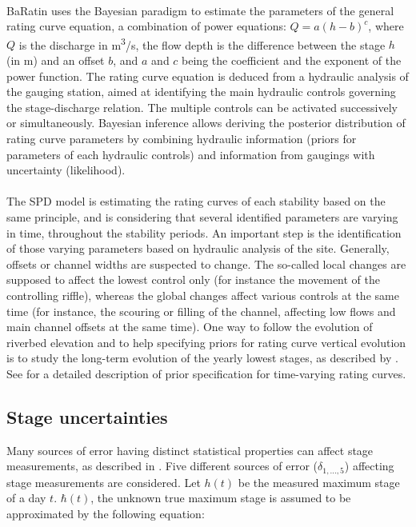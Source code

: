 \documentclass[11pt]{article}
\begin{document}
    \paragraph{} BaRatin uses the Bayesian paradigm to estimate the parameters of the general rating curve equation, a combination of power equations: $Q = a(h-b)^c$, where $Q$ is the discharge in m\textsuperscript{3}/s, the flow depth is the difference between the stage $h$ (in m) and an offset $b$, and $a$ and $c$ being the coefficient and the exponent of the power function. The rating curve equation is deduced from a hydraulic analysis of the gauging station, aimed at identifying the main hydraulic controls governing the stage-discharge relation. The multiple controls can be activated successively or simultaneously. Bayesian inference allows deriving the posterior distribution of rating curve parameters by combining hydraulic information (priors for parameters of each hydraulic controls) and information from gaugings with uncertainty (likelihood).
    \paragraph{}
    The SPD model is estimating the rating curves of each stability based on the same principle, and is considering that several identified parameters are varying in time, throughout the stability periods. An important step is the identification of those varying parameters based on hydraulic analysis of the site. Generally, offsets or channel widths are suspected to change. The so-called local changes are supposed to affect the lowest control only (for instance the movement of the controlling riffle), whereas the global changes affect various controls at the same time (for instance, the scouring or filling of the channel, affecting low flows and main channel offsets at the same time). One way to follow the evolution of riverbed elevation and to help specifying priors for rating curve vertical evolution is to study the long-term evolution of the yearly lowest stages, as described by \citet{lapuszek_methods_2015}. See \citet{mansanarez_shift_2019} for a detailed description of prior specification for time-varying rating curves. 
    
    \subsection{Stage uncertainties}
    \label{sec:StageErr}
    
    Many sources of error having distinct statistical properties can affect stage measurements, as described in \citet{horner_impact_2018}. Five different sources of error ($\delta_{1,...,5}$) affecting stage measurements are considered. Let $h(t)$ be the measured maximum stage of a day $t$. $\hbar(t)$, the unknown true maximum stage is assumed to be approximated by the following equation:
    
\end{document}
